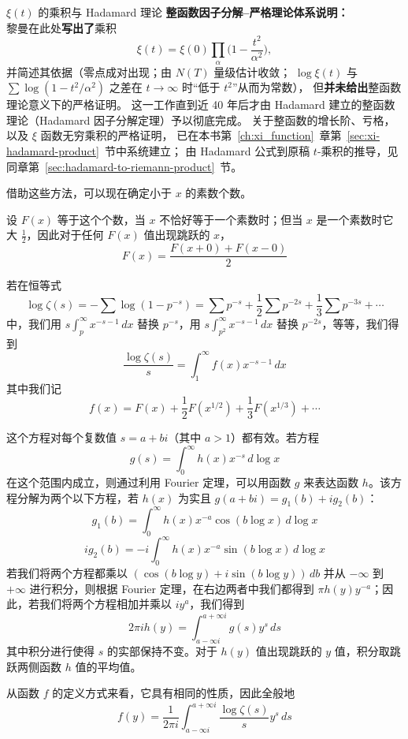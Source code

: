 \begin{commentary}{$\xi(t)$ 的乘积与 Hadamard 理论}
\textbf{整函数因子分解--严格理论体系说明：}\\
黎曼在此处\textbf{写出了}乘积
\[
\xi(t)=\xi(0)\prod_{\alpha}\Biggl(1-\frac{t^2}{\alpha^2}\Biggr),
\]
并简述其依据（零点成对出现；由 $N(T)$ 量级估计收敛；
$\log\xi(t)$ 与 $\sum\log(1-t^2/\alpha^2)$ 之差在 $t\to\infty$ 时“低于 $t^2$”从而为常数），
但\textbf{并未给出}整函数理论意义下的严格证明。
这一工作直到近 40 年后才由 Hadamard 建立的整函数理论（Hadamard 因子分解定理）予以彻底完成。
关于整函数的增长阶、亏格，以及 $\xi$ 函数无穷乘积的严格证明，
已在本书第~\ref{ch:xi_function}~章第~\ref{sec:xi-hadamard-product}~节中系统建立；
由 Hadamard 公式到原稿 $t$-乘积的推导，见同章第~\ref{sec:hadamard-to-riemann-product}~节。
\end{commentary}

借助这些方法，可以现在确定小于 $x$ 的素数个数。

设 $F(x)$ 等于这个个数，当 $x$ 不恰好等于一个素数时；但当 $x$ 是一个素数时它大 $\frac{1}{2}$，因此对于任何 $F(x)$ 值出现跳跃的 $x$，
\[
F(x) = \frac{F(x+0) + F(x-0)}{2}
\]

若在恒等式
\[
\log \zeta(s) = -\sum \log(1 - p^{-s}) = \sum p^{-s} + \frac{1}{2}\sum p^{-2s} + \frac{1}{3}\sum p^{-3s} + \cdots
\]
中，我们用 $s\int_p^{\infty} x^{-s-1} \, dx$ 替换 $p^{-s}$，用 $s\int_{p^2}^{\infty} x^{-s-1} \, dx$ 替换 $p^{-2s}$，等等，我们得到
\[
\frac{\log \zeta(s)}{s} = \int_1^{\infty} f(x) x^{-s-1} \, dx
\]
其中我们记
\[
f(x) = F(x) + \frac{1}{2}F(x^{1/2}) + \frac{1}{3}F(x^{1/3}) + \cdots
\]

这个方程对每个复数值 $s = a + bi$（其中 $a > 1$）都有效。若方程
\[
g(s) = \int_0^{\infty} h(x) x^{-s} \, d\log x
\]
在这个范围内成立，则通过利用 Fourier 定理，可以用函数 $g$ 来表达函数 $h$。该方程分解为两个以下方程，若 $h(x)$ 为实且 $g(a + bi) = g_1(b) + ig_2(b)$：
\[
g_1(b) = \int_0^{\infty} h(x) x^{-a} \cos(b\log x) \, d\log x
\]
\[
ig_2(b) = -i\int_0^{\infty} h(x) x^{-a} \sin(b\log x) \, d\log x
\]
若我们将两个方程都乘以 $(\cos(b\log y) + i\sin(b\log y)) \, db$ 并从 $-\infty$ 到 $+\infty$ 进行积分，则根据 Fourier 定理，在右边两者中我们都得到 $\pi h(y) y^{-a}$；因此，若我们将两个方程相加并乘以 $iy^a$，我们得到
\[
2\pi i h(y) = \int_{a-\infty i}^{a+\infty i} g(s) y^s \, ds
\]
其中积分进行使得 $s$ 的实部保持不变。对于 $h(y)$ 值出现跳跃的 $y$ 值，积分取跳跃两侧函数 $h$ 值的平均值。

从函数 $f$ 的定义方式来看，它具有相同的性质，因此全般地
\[
f(y) = \frac{1}{2\pi i} \int_{a-\infty i}^{a+\infty i} \frac{\log \zeta(s)}{s} y^s \, ds
\]

